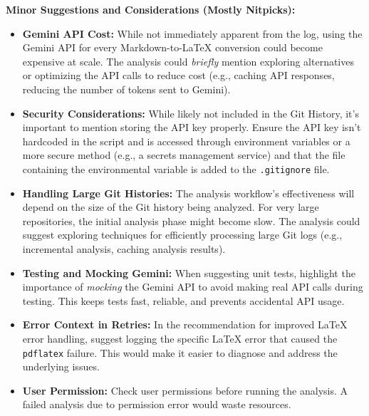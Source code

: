 \documentclass{article}
\begin{document}
\begin{itemize}
\begin{itemize}
\begin{itemize}
\begin{itemize}
            \end{itemize}
\textbf{Minor Suggestions and Considerations (Mostly Nitpicks):}
            \begin{itemize}
                \item \textbf{Gemini API Cost:} While not immediately apparent from the log, using the Gemini API for every Markdown-to-LaTeX conversion could become expensive at scale. The analysis could \textit{briefly} mention exploring alternatives or optimizing the API calls to reduce cost (e.g., caching API responses, reducing the number of tokens sent to Gemini).
                \item \textbf{Security Considerations:} While likely not included in the Git History, it's important to mention storing the API key properly. Ensure the API key isn't hardcoded in the script and is accessed through environment variables or a more secure method (e.g., a secrets management service) and that the file containing the environmental variable is added to the \texttt{.gitignore} file.
                \item \textbf{Handling Large Git Histories:} The analysis workflow's effectiveness will depend on the size of the Git history being analyzed. For very large repositories, the initial analysis phase might become slow. The analysis could suggest exploring techniques for efficiently processing large Git logs (e.g., incremental analysis, caching analysis results).
                \item \textbf{Testing and Mocking Gemini:} When suggesting unit tests, highlight the importance of \textit{mocking} the Gemini API to avoid making real API calls during testing. This keeps tests fast, reliable, and prevents accidental API usage.
                \item \textbf{Error Context in Retries:} In the recommendation for improved LaTeX error handling, suggest logging the specific LaTeX error that caused the \texttt{pdflatex} failure. This would make it easier to diagnose and address the underlying issues.
                 \item \textbf{User Permission:} Check user permissions before running the analysis. A failed analysis due to permission error would waste resources.
            \end{itemize}


\end{itemize}
\end{itemize}
\end{itemize}
\end{document}
